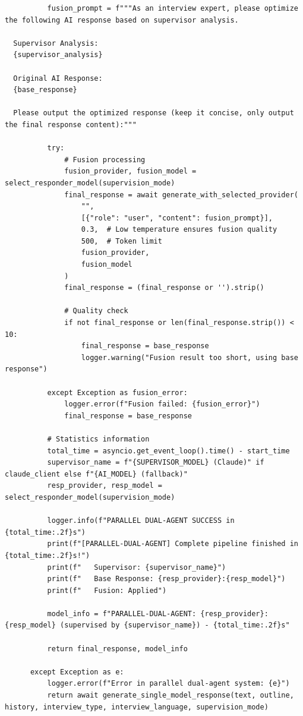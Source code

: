 \documentclass[sigchi,nonacm,manuscript]{acmart}
\begin{document}
\begin{lstlisting}
          fusion_prompt = f"""As an interview expert, please optimize the following AI response based on supervisor analysis.

  Supervisor Analysis:
  {supervisor_analysis}

  Original AI Response:
  {base_response}

  Please output the optimized response (keep it concise, only output the final response content):"""
          
          try:
              # Fusion processing
              fusion_provider, fusion_model = select_responder_model(supervision_mode)
              final_response = await generate_with_selected_provider(
                  "",
                  [{"role": "user", "content": fusion_prompt}],
                  0.3,  # Low temperature ensures fusion quality
                  500,  # Token limit
                  fusion_provider,
                  fusion_model
              )
              final_response = (final_response or '').strip()
              
              # Quality check
              if not final_response or len(final_response.strip()) < 10:
                  final_response = base_response
                  logger.warning("Fusion result too short, using base response")
              
          except Exception as fusion_error:
              logger.error(f"Fusion failed: {fusion_error}")
              final_response = base_response
          
          # Statistics information
          total_time = asyncio.get_event_loop().time() - start_time
          supervisor_name = f"{SUPERVISOR_MODEL} (Claude)" if claude_client else f"{AI_MODEL} (fallback)"
          resp_provider, resp_model = select_responder_model(supervision_mode)
          
          logger.info(f"PARALLEL DUAL-AGENT SUCCESS in {total_time:.2f}s")
          print(f"[PARALLEL-DUAL-AGENT] Complete pipeline finished in {total_time:.2f}s!")
          print(f"   Supervisor: {supervisor_name}")
          print(f"   Base Response: {resp_provider}:{resp_model}")
          print(f"   Fusion: Applied")
          
          model_info = f"PARALLEL-DUAL-AGENT: {resp_provider}:{resp_model} (supervised by {supervisor_name}) - {total_time:.2f}s"
          
          return final_response, model_info
          
      except Exception as e:
          logger.error(f"Error in parallel dual-agent system: {e}")
          return await generate_single_model_response(text, outline, history, interview_type, interview_language, supervision_mode)


\end{lstlisting}
\end{document}
